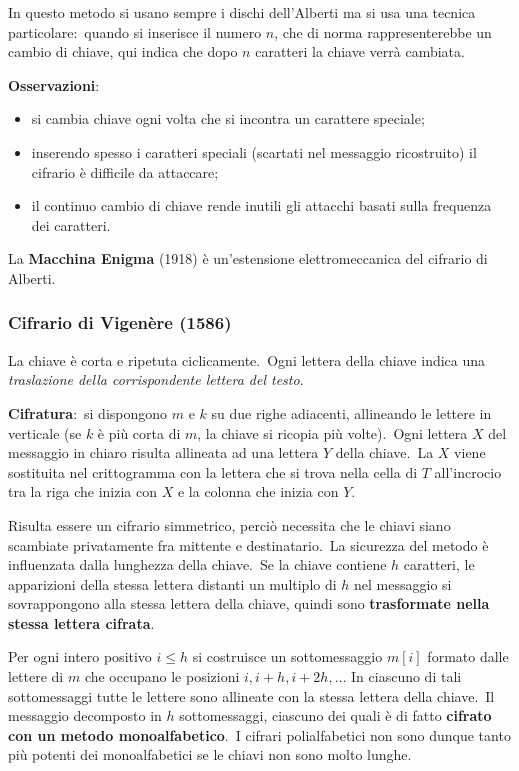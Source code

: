 In questo metodo si usano sempre i dischi dell'Alberti ma si usa una tecnica particolare:\ quando si inserisce il numero $n$, che di norma rappresenterebbe un cambio di chiave, qui indica che dopo $n$ caratteri la chiave verrà cambiata.\

\vspace{12pt}
\noindent\textbf{Osservazioni}:
\begin{itemize}
    \item si cambia chiave ogni volta che si incontra un carattere speciale;
    \item inserendo  spesso i caratteri speciali (scartati nel messaggio ricostruito) il cifrario è difficile da attaccare;
    \item il continuo cambio di chiave rende inutili gli attacchi basati sulla frequenza dei caratteri.\
\end{itemize}
La \textbf{Macchina Enigma} (1918) è un'estensione elettromeccanica del cifrario di Alberti.\

\subsubsection{Cifrario di Vigenère (1586)}

La chiave è corta e ripetuta ciclicamente.\
Ogni lettera della chiave indica una \textit{traslazione della corrispondente lettera del testo}.

\textbf{Cifratura}:\ si dispongono $m$ e $k$ su due righe adiacenti, allineando le lettere in verticale (se $k$ è più corta di $m$, la chiave si ricopia più volte).\
Ogni lettera $X$ del messaggio in chiaro risulta allineata ad una lettera $Y$ della chiave.\
La $X$ viene sostituita nel crittogramma con la lettera che si trova nella cella di $T$ all'incrocio tra la riga che inizia con $X$ e la colonna che inizia con $Y$.\

Risulta essere un cifrario simmetrico, perciò necessita che le chiavi siano scambiate privatamente fra mittente e destinatario.\
La sicurezza del metodo è influenzata dalla lunghezza della chiave.\
Se la chiave contiene $h$ caratteri, le apparizioni della stessa lettera distanti un multiplo di $h$ nel messaggio si sovrappongono alla stessa lettera della chiave, quindi sono \textbf{trasformate nella stessa lettera cifrata}.\

Per ogni intero positivo $i \leq h$ si costruisce un sottomessaggio $m[i]$ formato dalle lettere di $m$ che occupano le posizioni $i, i+h, i+2h,\dots$
In ciascuno di tali sottomessaggi tutte le lettere sono allineate con la stessa lettera della chiave.\
Il messaggio decomposto in $h$ sottomessaggi, ciascuno dei quali è di fatto \textbf{cifrato con un metodo monoalfabetico}.\
I cifrari polialfabetici non sono dunque tanto più potenti dei monoalfabetici se le chiavi non sono molto lunghe.\

